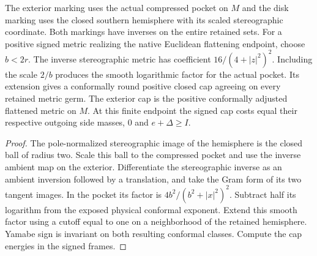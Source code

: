 \begin{proposition}
\label{prop:ed45-transport-caps}
\leanok
The exterior marking uses the actual compressed pocket on $M$ and the
disk marking uses the closed southern hemisphere with its scaled
stereographic coordinate. Both markings have inverses on the entire
retained sets. For a positive signed metric realizing the native Euclidean flattening
endpoint, choose $b<2r$. The inverse stereographic metric has coefficient
$16/(4+|z|^2)^2$. Including the scale $2/b$ produces the smooth
logarithmic factor for the actual pocket. Its extension gives a conformally
round positive closed cap agreeing on every retained metric germ. The exterior cap
is the positive conformally adjusted flattened metric on $M$.
At this finite endpoint the signed cap costs equal their respective
outgoing side masses, $0$ and $e+\Delta\ge I$.
\end{proposition}
\begin{proof}
\leanok
The pole-normalized stereographic image of the hemisphere is the closed
ball of radius two. Scale this ball to the compressed pocket and use
the inverse ambient map on the exterior. Differentiate the stereographic inverse as an ambient inversion followed
by a translation, and take the Gram form of its two tangent images. In the
pocket its factor is $4b^2/(b^2+|x|^2)^2$. Subtract half its logarithm
from the exposed physical conformal exponent. Extend this smooth factor
using a cutoff equal to one on a neighborhood of the retained
hemisphere. Yamabe sign is invariant on both resulting conformal
classes. Compute the cap energies in the signed frames.
\end{proof}


